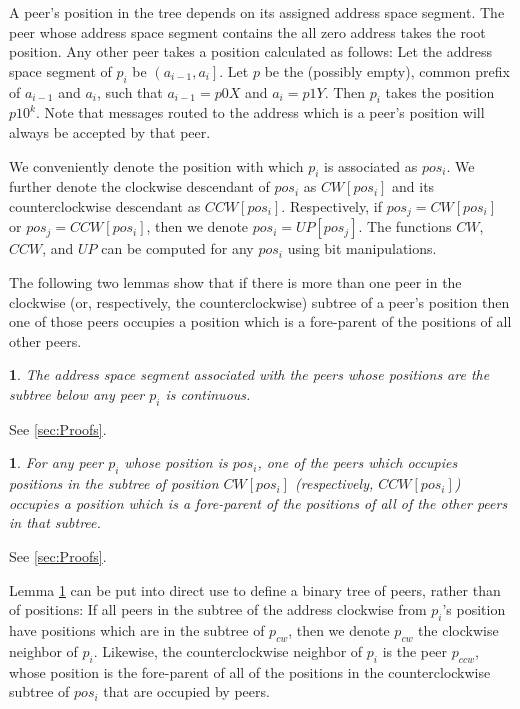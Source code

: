 \documentclass[12pt,english,journal]{elsarticle}
\makeatletter
\numberwithin{equation}{section}
\numberwithin{figure}{section}
\theoremstyle{plain}
\theoremstyle{plain}
\newtheorem{lem}[thm]{\protect\lemmaname}
\newenvironment{proof}[1][\protect\proofname]{\par
\normalfont\topsep6\p@\@plus6\p@\relax
\trivlist
\itemindent\parindent
\item[\hskip\labelsep
\scshape
#1]\ignorespaces
}{\endtrivlist\@endpefalse
}
\providecommand{\proofname}{Proof}
\providecommand{\lemmaname}{Lemma}
\makeatother
\begin{document}
A peer's position in the tree depends on its assigned address space
segment. The peer whose address space segment contains the all zero
address takes the root position. Any other peer takes a position calculated
as follows: Let the address space segment of $p_{i}$ be $\left(a_{i-1},a_{i}\right]$.
Let $p$ be the (possibly empty), common prefix of $a_{i-1}$ and
$a_{i}$, such that $a_{i-1}=p0X$ and $a_{i}=p1Y$. Then $p_{i}$
takes the position $p10^{k}$. Note that messages routed to the address
which is a peer's position will always be accepted by that peer. 

We conveniently denote the position with which $p_{i}$ is associated
as $pos_{i}$. We further denote the clockwise descendant of $pos_{i}$
as $CW\left[pos_{i}\right]$ and its counterclockwise descendant as
$CCW\left[pos_{i}\right]$. Respectively, if $pos_{j}=CW\left[pos_{i}\right]$
or $pos_{j}=CCW\left[pos_{i}\right]$, then we denote $pos_{i}=UP\left[pos_{j}\right]$.
The functions $CW$, $CCW$, and $UP$ can be computed for any $pos_{i}$
using bit manipulations. 

The following two lemmas show that if there is more than one peer
in the clockwise (or, respectively, the counterclockwise) subtree
of a peer's position then one of those peers occupies a position which
is a fore-parent of the positions of all other peers.
\begin{lem}
\label{lem:continuous}The address space segment associated with the
peers whose positions are the subtree below any peer $p_{i}$ is continuous.\end{lem}
\begin{proof}
See \ref{sec:Proofs}.\end{proof}
\begin{lem}
\label{lem:singularDescendant}For any peer $p_{i}$ whose position
is $pos_{i}$, one of the peers which occupies positions in the subtree
of position $CW\left[pos_{i}\right]$ (respectively, $CCW\left[pos_{i}\right]$)
occupies a position which is a fore-parent of the positions of all
of the other peers in that subtree.\end{lem}
\begin{proof}
See \ref{sec:Proofs}.
\end{proof}


Lemma \ref{lem:singularDescendant} can be put into direct use to
define a binary tree of peers, rather than of positions: If all peers
in the subtree of the address clockwise from $p_{i}$'s position have
positions which are in the subtree of $p_{cw}$, then we denote $p_{cw}$
the clockwise neighbor of $p_{i}$. Likewise, the counterclockwise
neighbor of $p_{i}$ is the peer $p_{ccw}$, whose position is the
fore-parent of all of the positions in the counterclockwise subtree
of $pos_{i}$ that are occupied by peers. 
\end{document}
